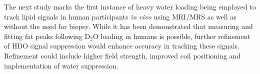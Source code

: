 \documentclass[class=article, crop=false]{standalone}
\begin{document}
The next study marks the first instance of heavy water loading being employed to track lipid signals in human participants \textit{in vivo} using MRI/MRS as well as without the need for biopsy. While it has been demonstrated that measuring and fitting fat peaks following D$_2$O loading in humans is possible, further refinement of HDO signal suppression would enhance accuracy in tracking these signals. Refinement could include higher field strength, improved coil positioning and implementation of water suppression. 

\end{document}
